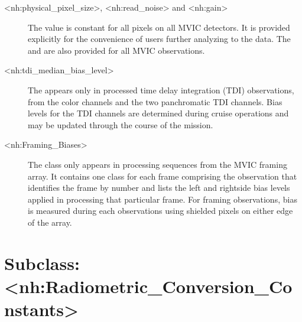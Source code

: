 \documentclass[letterpaper,10pt,english]{sphinxmanual}
\begin{document}
\begin{description}
\item[{\textless{}nh:physical\_pixel\_size\textgreater{}, \textless{}nh:read\_noise\textgreater{} and \textless{}nh:gain\textgreater{}}] \leavevmode
\sphinxAtStartPar
The  value is constant for all pixels on all MVIC
detectors. It is provided explicitly for the convenience of users
further analyzing to the data. The  and  are
also provided for all MVIC observations.

\item[{\textless{}nh:tdi\_median\_bias\_level\textgreater{}}] \leavevmode
\sphinxAtStartPar
The  appears only in processed time delay integration
(TDI) observations, from the color channels and the two panchromatic TDI channels.
Bias levels for the TDI channels are determined during cruise operations and
may be updated through the course of the mission.

\item[{\textless{}nh:Framing\_Biases\textgreater{}}] \leavevmode
\sphinxAtStartPar
The  class only appears in processing sequences from the MVIC
framing array. It contains one  class for each frame
comprising the observation that identifies the frame by number and lists the
left\sphinxhyphen{} and right\sphinxhyphen{}side bias levels applied
in processing that particular frame. For framing observations, bias is measured
during each observations using shielded pixels on either edge of the array.

\end{description}


\section{Subclass: \textless{}nh:Radiometric\_Conversion\_Constants\textgreater{}}
\label{\detokenize{user/user-guide:subclass-nh-radiometric-conversion-constants}}\label{\detokenize{user/user-guide:radiometric-conversion-constants}}
\sphinxAtStartPar
{} 
\end{document}
